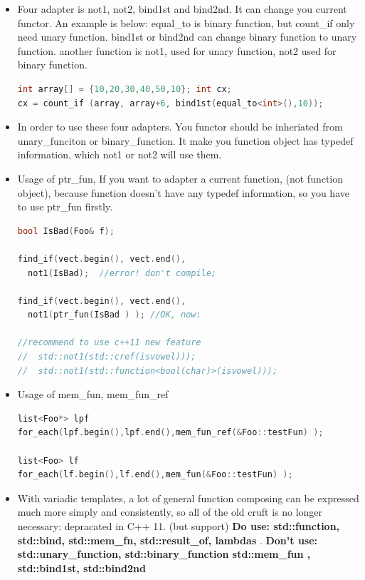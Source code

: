 \documentclass[a4paper,12pt,twoside]{book}
\begin{document}
\begin{itemize}
\item Four adapter is not1, not2, bind1st and bind2nd. It can change you current functor. An example is below: equal\_to is binary function, but count\_if only need unary function.  bind1st or bind2nd can change binary function to unary function.  another function is not1, used for unary function, not2 used for binary function.
\begin{lstlisting}[frame=single, language=c++]
int array[] = {10,20,30,40,50,10}; int cx;
cx = count_if (array, array+6, bind1st(equal_to<int>(),10));
\end{lstlisting}

\item In order to use these four adapters. You functor should be inheriated from unary\_funciton or binary\_function. It make you function object has typedef information, which not1 or not2 will use them.

\item Usage of ptr\_fun, If you want to adapter a current function, (not function object), because function doesn't have any typedef information, so you have to use ptr\_fun firstly.
\begin{lstlisting}[frame=single, language=c++]
bool IsBad(Foo& f);

find_if(vect.begin(), vect.end(),
  not1(IsBad);  //error! don't compile;

find_if(vect.begin(), vect.end(),
  not1(ptr_fun(IsBad ) ); //OK, now:

//recommend to use c++11 new feature
//  std::not1(std::cref(isvowel)));
//  std::not1(std::function<bool(char)>(isvowel)));
\end{lstlisting}


\item Usage of mem\_fun, mem\_fun\_ref
\begin{lstlisting}[frame=single, language=c++]
list<Foo*> lpf
for_each(lpf.begin(),lpf.end(),mem_fun_ref(&Foo::testFun) );

list<Foo> lf
for_each(lf.begin(),lf.end(),mem_fun(&Foo::testFun) );
\end{lstlisting}

\item With variadic templates, a lot of general function composing can be expressed much more simply and consistently, so all of the old cruft is no longer necessary: depracated in C++ 11. (but support)
\textbf{Do use: std::function, std::bind, std::mem\_fn, std::result\_of, lambdas }.  \textbf{Don't use: std::unary\_function, std::binary\_function
std::mem\_fun , std::bind1st, std::bind2nd}

\end{itemize}
\end{document}
